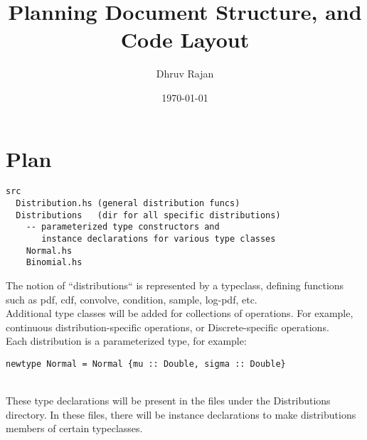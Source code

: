 \documentclass[12pt]{article}
\begin{document}
\title{Planning Document Structure, and Code Layout}
\author{Dhruv Rajan}
\date{\today}
\maketitle

\section{Plan}

\begin{verbatim}
src
  Distribution.hs (general distribution funcs)
  Distributions   (dir for all specific distributions)
    -- parameterized type constructors and
       instance declarations for various type classes
    Normal.hs
    Binomial.hs
\end{verbatim}

The notion of ``distributions`` is represented by a typeclass,
defining functions such as pdf, cdf, convolve, condition, sample,
log-pdf, etc. \\

Additional type classes will be added for collections of operations.
For example, continuous distribution-specific operations, or
Discrete-specific operations. \\

Each distribution is a parameterized type, for example: \\
\begin{verbatim}newtype Normal = Normal {mu :: Double, sigma :: Double} \end{verbatim}\\
These type declarations will be present in the files under the
Distributions directory. In these files, there will be instance
declarations to make distributions members of certain typeclasses.
\end{document}
